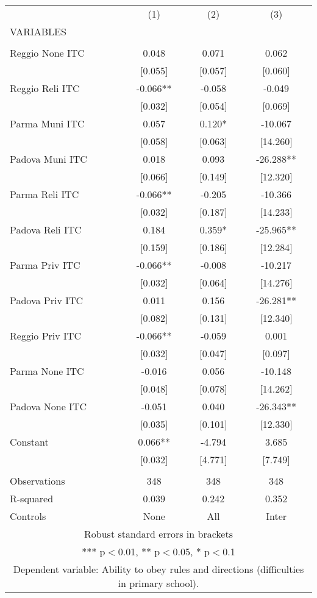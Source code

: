 \begin{tabular}{lccc} \hline
 & (1) & (2) & (3) \\
VARIABLES &  &  &  \\ \hline
 &  &  &  \\
Reggio None ITC & 0.048 & 0.071 & 0.062 \\
 & [0.055] & [0.057] & [0.060] \\
Reggio Reli ITC & -0.066** & -0.058 & -0.049 \\
 & [0.032] & [0.054] & [0.069] \\
Parma Muni ITC & 0.057 & 0.120* & -10.067 \\
 & [0.058] & [0.063] & [14.260] \\
Padova Muni ITC & 0.018 & 0.093 & -26.288** \\
 & [0.066] & [0.149] & [12.320] \\
Parma Reli ITC & -0.066** & -0.205 & -10.366 \\
 & [0.032] & [0.187] & [14.233] \\
Padova Reli ITC & 0.184 & 0.359* & -25.965** \\
 & [0.159] & [0.186] & [12.284] \\
Parma Priv ITC & -0.066** & -0.008 & -10.217 \\
 & [0.032] & [0.064] & [14.276] \\
Padova Priv ITC & 0.011 & 0.156 & -26.281** \\
 & [0.082] & [0.131] & [12.340] \\
Reggio Priv ITC & -0.066** & -0.059 & 0.001 \\
 & [0.032] & [0.047] & [0.097] \\
Parma None ITC & -0.016 & 0.056 & -10.148 \\
 & [0.048] & [0.078] & [14.262] \\
Padova None ITC & -0.051 & 0.040 & -26.343** \\
 & [0.035] & [0.101] & [12.330] \\
Constant & 0.066** & -4.794 & 3.685 \\
 & [0.032] & [4.771] & [7.749] \\
 &  &  &  \\
Observations & 348 & 348 & 348 \\
R-squared & 0.039 & 0.242 & 0.352 \\
 Controls & None & All & Inter \\ \hline
\multicolumn{4}{c}{ Robust standard errors in brackets} \\
\multicolumn{4}{c}{ *** p$<$0.01, ** p$<$0.05, * p$<$0.1} \\
\multicolumn{4}{c}{ Dependent variable: Ability to obey rules and directions (difficulties in primary school).} \\
\end{tabular}
